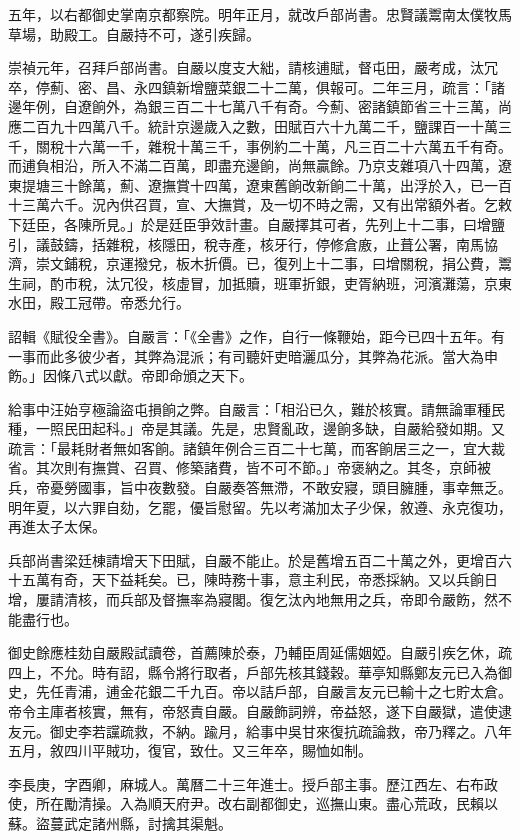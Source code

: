 \begin{pinyinscope}
五年，以右都御史掌南京都察院。明年正月，就改戶部尚書。忠賢議鬻南太僕牧馬草場，助殿工。自嚴持不可，遂引疾歸。

崇禎元年，召拜戶部尚書。自嚴以度支大絀，請核逋賦，督屯田，嚴考成，汰冗卒，停薊、密、昌、永四鎮新增鹽菜銀二十二萬，俱報可。二年三月，疏言：「諸邊年例，自遼餉外，為銀三百二十七萬八千有奇。今薊、密諸鎮節省三十三萬，尚應二百九十四萬八千。統計京邊歲入之數，田賦百六十九萬二千，鹽課百一十萬三千，關稅十六萬一千，雜稅十萬三千，事例約二十萬，凡三百二十六萬五千有奇。而逋負相沿，所入不滿二百萬，即盡充邊餉，尚無贏餘。乃京支雜項八十四萬，遼東提塘三十餘萬，薊、遼撫賞十四萬，遼東舊餉改新餉二十萬，出浮於入，已一百十三萬六千。況內供召買，宣、大撫賞，及一切不時之需，又有出常額外者。乞敕下廷臣，各陳所見。」於是廷臣爭效計畫。自嚴擇其可者，先列上十二事，曰增鹽引，議鼓鑄，括雜稅，核隱田，稅寺產，核牙行，停修倉廒，止葺公署，南馬協濟，崇文鋪稅，京運撥兌，板木折價。已，復列上十二事，曰增關稅，捐公費，鬻生祠，酌市稅，汰冗役，核虛冒，加抵贖，班軍折銀，吏胥納班，河濱灘蕩，京東水田，殿工冠帶。帝悉允行。

詔輯《賦役全書》。自嚴言：「《全書》之作，自行一條鞭始，距今已四十五年。有一事而此多彼少者，其弊為混派；有司聽奸吏暗灑瓜分，其弊為花派。當大為申飭。」因條八式以獻。帝即命頒之天下。

給事中汪始亨極論盜屯損餉之弊。自嚴言：「相沿已久，難於核實。請無論軍種民種，一照民田起科。」帝是其議。先是，忠賢亂政，邊餉多缺，自嚴給發如期。又疏言：「最耗財者無如客餉。諸鎮年例合三百二十七萬，而客餉居三之一，宜大裁省。其次則有撫賞、召買、修築諸費，皆不可不節。」帝褒納之。其冬，京師被兵，帝憂勞國事，旨中夜數發。自嚴奏答無滯，不敢安寢，頭目臃腫，事幸無乏。明年夏，以六罪自劾，乞罷，優旨慰留。先以考滿加太子少保，敘遵、永克復功，再進太子太保。

兵部尚書梁廷棟請增天下田賦，自嚴不能止。於是舊增五百二十萬之外，更增百六十五萬有奇，天下益耗矣。已，陳時務十事，意主利民，帝悉採納。又以兵餉日增，屢請清核，而兵部及督撫率為寢閣。復乞汰內地無用之兵，帝即令嚴飭，然不能盡行也。

御史餘應桂劾自嚴殿試讀卷，首薦陳於泰，乃輔臣周延儒姻婭。自嚴引疾乞休，疏四上，不允。時有詔，縣令將行取者，戶部先核其錢穀。華亭知縣鄭友元已入為御史，先任青浦，逋金花銀二千九百。帝以詰戶部，自嚴言友元已輸十之七貯太倉。帝令主庫者核實，無有，帝怒責自嚴。自嚴飾詞辨，帝益怒，遂下自嚴獄，遣使逮友元。御史李若讜疏救，不納。踰月，給事中吳甘來復抗疏論救，帝乃釋之。八年五月，敘四川平賊功，復官，致仕。又三年卒，賜恤如制。

李長庚，字酉卿，麻城人。萬曆二十三年進士。授戶部主事。歷江西左、右布政使，所在勵清操。入為順天府尹。改右副都御史，巡撫山東。盡心荒政，民賴以蘇。盜蔓武定諸州縣，討擒其渠魁。


\end{pinyinscope}
